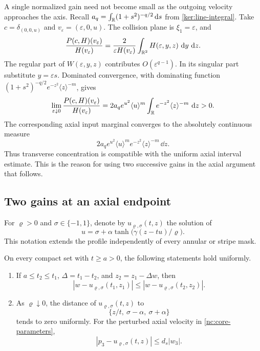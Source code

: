 \begin{remark}\label{ker:matching-axis}
A single normalized gain need not become small as the outgoing
velocity approaches the axis. Recall
$a_q=\int_{\mathbb R}(1+s^2)^{-q/2}\,\mathrm d s$ from \eqref{ker:line-integral}. Take
$c=\delta_{(0,0,u)}$ and
$v_\varepsilon=(\varepsilon,0,u)$. The collision plane is
$\xi_1=\varepsilon$, and
\[
 \frac{P(c,H)(v_\varepsilon)}{H(v_\varepsilon)}
 =\frac{2}{\varepsilon H(v_\varepsilon)}
      \int_{\mathbb R^2}H(\varepsilon,y,z)\,\,\mathrm d y\,\,\mathrm d z.
\]
The regular part of $W(\varepsilon,y,z)$ contributes
$O(\varepsilon^{q-1})$. In its singular part substitute
$y=\varepsilon s$. Dominated convergence, with dominating function
$(1+s^2)^{-q/2}e^{-z^2}\langle z\rangle^{-m}$, gives
\[
 \lim_{\varepsilon\downarrow0}
 \frac{P(c,H)(v_\varepsilon)}{H(v_\varepsilon)}
 =2a_q e^{u^2}\langle u\rangle^m
        \int_{\mathbb R}e^{-z^2}\langle z\rangle^{-m}\,\,\mathrm d z>0.
\]
The corresponding axial input marginal converges to the absolutely
continuous measure
\[
2a_q e^{u^2}\langle u\rangle^m
 e^{-z^2}\langle z\rangle^{-m}\,\dd z.
\]
Thus transverse concentration is compatible with the uniform axial
interval estimate. This is the reason for using two successive gains
in the axial argument that follows.
\end{remark}

\subsection{Two gains at an axial endpoint}

For \(\varrho>0\) and \(\sigma\in\{-1,1\}\), denote by
\(u_{\varrho,\sigma}(t,z)\) the solution of
\[
 u=\sigma+\alpha\tanh\bigl(\gamma(z-tu)/\varrho\bigr).
\]
This notation extends the profile independently of every annular
or stripe mask.

\begin{lemma}
\label{nc:characteristic-matching}
On every compact set with \(t\ge a>0\), the following statements
hold uniformly.
\begin{enumerate}[label=\textup{(\roman*)}]
\item If \(a\le t_2\le t_1\), \(\Delta=t_1-t_2\), and
\(z_2=z_1-\Delta w\), then
\begin{equation}
\label{nc:matching-inequality}
 |w-u_{\varrho,\sigma}(t_1,z_1)|
 \le |w-u_{\varrho,\sigma}(t_2,z_2)|.
\end{equation}
\item As \(\varrho\downarrow0\), the distance of
\(u_{\varrho,\sigma}(t,z)\) to
\[
 \{z/t,\ \sigma-\alpha,\ \sigma+\alpha\}
\]
tends to zero uniformly.  For the perturbed axial velocity in
\eqref{nc:core-parameters},
\begin{equation}
\label{nc:thermal-speed-error}
 |p_3-u_{\varrho,\sigma}(t,z)|\le d_s|w_3|.
\end{equation}
\end{enumerate}
\end{lemma}

